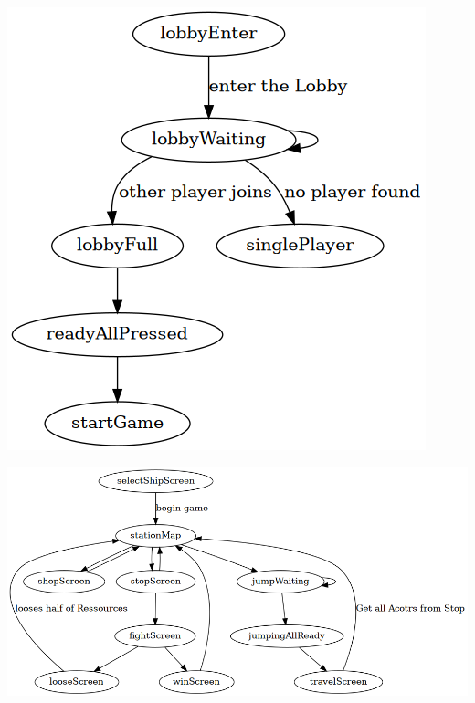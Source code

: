\documentclass[11pt]{article}
\begin{document}
\begin{center}
\includegraphics[width=.9\linewidth]{Multiplayer.png}
\end{center}



\begin{center}
\includegraphics[width=.9\linewidth]{jumping.png}
\end{center}
\end{document}
